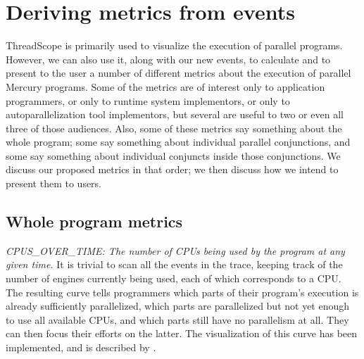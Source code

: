 \section{Deriving metrics from events}
\label{sec:analysis}

ThreadScope is primarily used to visualize the execution of parallel programs.
However, we can also use it, along with our new events,
to calculate and to present to the user
a number of different metrics about the execution of parallel Mercury programs.
Some of the metrics are of interest
only to application programmers,
or only to runtime system implementors,
or only to autoparallelization tool implementors,
but several are useful to two or even all three of those audiences.
Also, some of these metrics say something about the whole program;
some say something about individual parallel conjunctions,
and some say something about individual conjuncts inside those conjunctions.
We discuss our proposed metrics in that order;
we then discuss how we intend to present them to users.

% 

\subsection{Whole program metrics}



\emph{CPUS\_OVER\_TIME:
The number of CPUs being used by the program at any given time.}
It is trivial to scan all the events in the trace,
keeping track of the number of engines currently being used,
each of which corresponds to a CPU.
The resulting curve tells programmers
which parts of their program's execution is already sufficiently parallelized,
which parts are parallelized but not yet enough to use all available CPUs,
and which parts still have no parallelism at all.
They can then focus their efforts on the latter.
The visualization of this curve has been implemented,
and is described by \cite{threadscope}.

